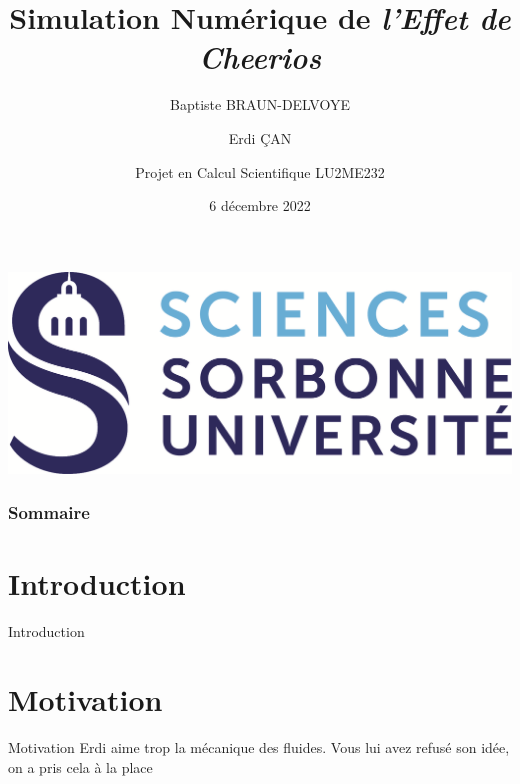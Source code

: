 \documentclass[aspectratio=169,xcolor=dvipsnames]{beamer}
\title[Simulation Numérique de \textit{l'Effet de Cheerios}]{Simulation Numérique de \textit{l'Effet de Cheerios}}
\author[Nous] {Baptiste BRAUN-DELVOYE\\\and Erdi ÇAN \\\and Projet en Calcul Scientifique LU2ME232}
\date{6 décembre 2022} %
\institute{Sorbonne Université, CMI Mécanique}
\begin{document}
{
\begin{frame}
    \titlepage
    \centering
    \includegraphics[scale=.2]{SORBONNE_FAC_SCIENCES_DEF_CMJN.png}
\end{frame}
}

\begin{frame}
    \frametitle{Sommaire}
    \tableofcontents
\end{frame}

\section{Introduction}
\begin{frame}{Introduction}%
    \begin{center}
    \end{center}
\end{frame}

\section{Motivation}
\begin{frame}{Motivation}
    Erdi aime trop la mécanique des fluides. Vous lui avez refusé son idée, on a pris cela à la place
\end{frame}
\end{document}
